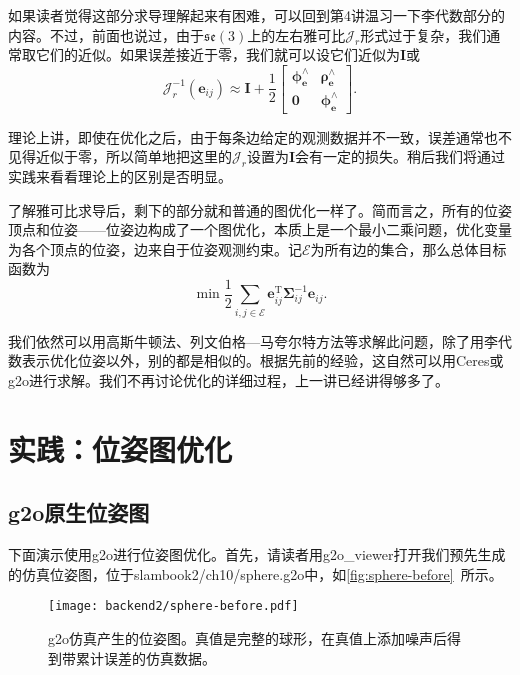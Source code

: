 如果读者觉得这部分求导理解起来有困难，可以回到第4讲温习一下李代数部分的内容。不过，前面也说过，由于$\mathfrak{se}(3)$上的左右雅可比$\bm{\mathcal{J}}_r$形式过于复杂，我们通常取它们的近似。如果误差接近于零，我们就可以设它们近似为$\bm{I}$或
\begin{equation}
\bm{\mathcal{J}}_r^{-1}(\bm{e}_{ij}) \approx \bm{I} + \frac{1}{2} 
\left[ 
{\begin{array}{*{20}{c}}
	{{\bm{\phi}_{\bm{e}} ^ \wedge }}&{{\bm{\rho}_{\bm{e}} ^ \wedge }}\\
	{\bm{0}}&{{\bm{\phi}_{\bm{e}} ^ \wedge }}
\end{array}} 
\right].
\end{equation}

理论上讲，即使在优化之后，由于每条边给定的观测数据并不一致，误差通常也不见得近似于零，所以简单地把这里的$\bm{\mathcal{J}}_r$设置为$\bm{I}$会有一定的损失。稍后我们将通过实践来看看理论上的区别是否明显。

了解雅可比求导后，剩下的部分就和普通的图优化一样了。简而言之，所有的位姿顶点和位姿——位姿边构成了一个图优化，本质上是一个最小二乘问题，优化变量为各个顶点的位姿，边来自于位姿观测约束。记$\mathcal{E}$为所有边的集合，那么总体目标函数为
\begin{equation}
\mathop {\min }\limits \frac{1}{2}\sum\limits_{i,j \in \mathcal{E}} \bm{e}_{ij}^\mathrm{T} \bm{\Sigma}_{ij}^{-1} \bm{e}_{ij}.
\end{equation}

我们依然可以用高斯牛顿法、列文伯格—马夸尔特方法等求解此问题，除了用李代数表示优化位姿以外，别的都是相似的。根据先前的经验，这自然可以用Ceres或g2o进行求解。我们不再讨论优化的详细过程，上一讲已经讲得够多了。

\section{实践：位姿图优化}
\subsection{g2o原生位姿图}
下面演示使用g2o进行位姿图优化。首先，请读者用g2o\_viewer打开我们预先生成的仿真位姿图，位于slambook2/ch10/sphere.g2o中，如\autoref{fig:sphere-before}~所示。

\begin{figure}[!htp]
	\centering
	\texttt{[image: backend2/sphere-before.pdf]}
	\caption{g2o仿真产生的位姿图。真值是完整的球形，在真值上添加噪声后得到带累计误差的仿真数据。}
	\label{fig:sphere-before}
\end{figure}

